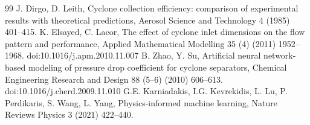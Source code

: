 \documentclass[12pt]{article}
\begin{document}
\begin{thebibliography}{99}
J. Dirgo, D. Leith, Cyclone collection efficiency: comparison of experimental results with theoretical predictions, Aerosol Science and Technology 4 (1985) 401--415.
K. Elsayed, C. Lacor, The effect of cyclone inlet dimensions on the flow pattern and performance, Applied Mathematical Modelling 35 (4) (2011) 1952--1968. doi:10.1016/j.apm.2010.11.007
B. Zhao, Y. Su, Artificial neural network-based modeling of pressure drop coefficient for cyclone separators, Chemical Engineering Research and Design 88 (5--6) (2010) 606--613. doi:10.1016/j.cherd.2009.11.010
G.E. Karniadakis, I.G. Kevrekidis, L. Lu, P. Perdikaris, S. Wang, L. Yang, Physics-informed machine learning, Nature Reviews Physics 3 (2021) 422--440.
\end{thebibliography}
\end{document}
